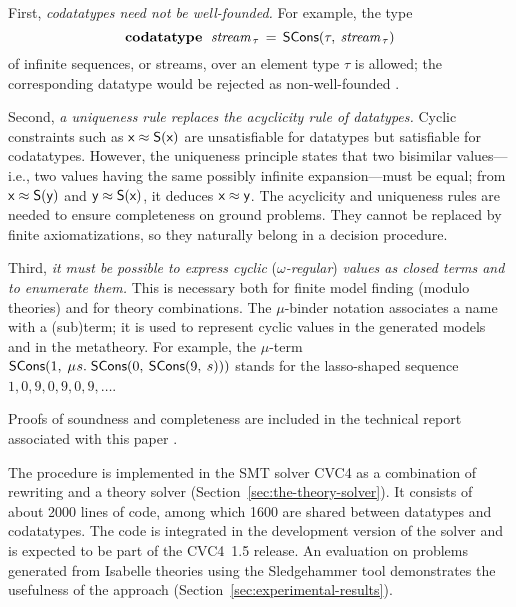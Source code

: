 First, \emph{codatatypes need not be well-founded.}
For example, the type
%
\[\textbf{codatatype}~\;\textit{stream}_{\,\tau} \,=\, \textsf{SCons}(\tau,\: \textit{stream}_{\,\tau})\]
%
of infinite sequences, or streams, over an element type $\tau$ is allowed; the
corresponding datatype would be rejected as non-well-founded \cite{blanchette-et-al-2015-esop}.

Second, \emph{a uniqueness rule replaces the acyclicity rule of datatypes.}
Cyclic constraints such as
$\textsf{x} \approx \textsf{S}(\textsf{x})$ %
are unsatisfiable for datatypes but satisfiable for codatatypes.
However, the uniqueness principle states that two bisimilar values---i.e., two values
having the same possibly infinite expansion---must be equal; from $\textsf{x}
\approx \textsf{S}(\textsf{y})$ and
$\textsf{y} \approx \textsf{S}(\textsf{x})$, it deduces $\textsf{x} \approx \textsf{y}$.
The acyclicity and uniqueness rules are needed to ensure completeness on
ground problems. %
They cannot be replaced by
finite axiomatizations, so they naturally belong in a decision procedure.

Third, \emph{it must be possible to express cyclic }(\emph{$\omega$-regular}) \emph{values as closed terms and
to enumerate them.} This is necessary both for finite model finding (modulo theories)
and for theory combinations. The $\mu$-binder notation associates a name with
a (sub)term; it is used to represent cyclic values in the generated models and
in the metatheory. For example,
the $\mu$-term $\const{SCons}(1,\: \MU s.\; \const{SCons}(0,\: \const{SCons}(9,\: s)))$
stands for the lasso-shaped sequence $1, 0, 9, 0, 9, 0, 9, \ldots$\afterLdots.



\begin{paper}
Proofs of soundness and completeness are included in the technical report
associated with this paper \cite{our-report}.
\end{paper}%
The procedure is implemented in the SMT solver CVC4 as a combination
of rewriting and a theory solver
(Section~\ref{sec:the-theory-solver}).
It consists of about 2000 lines of \cpp{} code, among which 1600 are
shared between datatypes and codatatypes. The code is integrated in the
development version of the solver and is expected to be part of the CVC4~1.5 release.
%
An evaluation on %
problems generated from Isabelle theories using the Sledgehammer tool
demonstrates the usefulness of the approach (Section~\ref{sec:experimental-results}).

